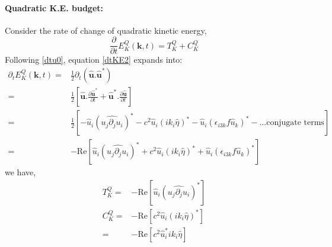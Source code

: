 \documentclass[a4paper,12pt]{paper}
\newcommand{\pder}[2][]{\frac{\partial#1}{\partial#2}}
\begin{document}
\paragraph{Quadratic K.E. budget:}
Consider the rate of change of quadratic kinetic energy,
\begin{equation}\label{dtKE2}
 \pder{t}E_K^{Q}(\mathbf{k},t) = T_K^{Q} + C_K^{Q}
\end{equation}
Following \eqref{dtu0}, equation \eqref{dtKE2} expands into:
\begin{align*}
 \partial_t E_K^{Q}(\mathbf{k},t)
 =& \frac{1}{2}\partial_t(\mathbf{\hat u}.\mathbf{\hat u^*})\\
 =& \frac{1}{2}\left[ \mathbf{\hat u} .\pder[\mathbf{\hat u^*}]{t} 
		      + \mathbf{\hat u^*}. \pder[\mathbf{\hat u}]{t}\right]\\
 =& \frac{1}{2}\left[ -\hat{u}_i (\widehat{ u_j\partial_j u_i })^* 
    - c^2 \hat{u}_i (ik_i \hat{\eta})^* 
    - \hat{u}_i (\epsilon_{i3k} f \hat{u}_k)^*
    - ... \text{conjugate terms}
    \right]\\
 =& -\text{Re}\left[ \hat{u}_i (\widehat{ u_j\partial_j u_i })^* 
    + c^2 \hat{u}_i (ik_i \hat{\eta})^* 
    + \hat{u}_i (\epsilon_{i3k} f \hat{u}_k)^* \right]
\end{align*}
we have,
\begin{align}
 T_K^{Q}= &-\text{Re}\left[\hat{u}_i (\widehat{ u_j\partial_j u_i })^* 
	   \right]\\
 C_K^{Q}= &-\text{Re}\left[   c^2 \hat{u}_i (ik_i \hat{\eta})^*  \right]\\
 	= &-\text{Re}\left[   c^2 \hat{u}_i^* ik_i \hat{\eta} \right]
\end{align}

\end{document}

